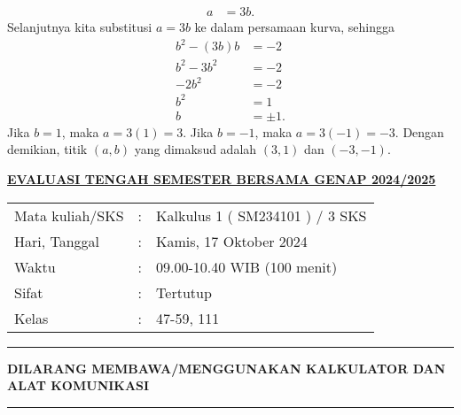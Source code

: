\documentclass[11pt,openany,a4paper]{article}
\renewcommand{\headrulewidth}{0pt}
\renewcommand{\footrulewidth}{0pt}
\begin{document}
\begin{enumerate}
\begin{align*}
              a                                    & = 3b.
          \end{align*}
          Selanjutnya kita substitusi $a=3b$ ke dalam persamaan kurva, sehingga
          \begin{align*}
              b^2 - (3b)b & = -2     \\
              b^2 - 3b^2  & = -2     \\
              -2b^2       & = -2     \\
              b^2         & = 1      \\
              b           & = \pm 1.
          \end{align*}
          Jika $b=1$, maka $a=3(1)=3$. Jika $b=-1$, maka $a=3(-1)=-3$. Dengan demikian, titik $(a,b)$ yang dimaksud adalah $(3,1)$ dan $(-3,-1)$.
\end{enumerate}

\newpage
\renewcommand{\arraystretch}{1}
\fancyhead{}
\fancyfoot{}
\fancyhead[r]{}
\renewcommand{\headrulewidth}{0pt}
\renewcommand{\footrulewidth}{0pt}
\begin{center}
    {\underline{\textbf{\MakeUppercase{Evaluasi Tengah Semester Bersama Genap 2024/2025}}}}
\end{center}

\begin{center}
    \begin{tabular}{lcl}
        Mata kuliah/SKS & : & Kalkulus 1 ( SM234101 ) / 3 SKS \\
        Hari, Tanggal   & : & Kamis, 17 Oktober 2024          \\
        Waktu           & : & 09.00-10.40 WIB (100 menit)     \\
        Sifat           & : & Tertutup                        \\
        Kelas           & : & 47-59, 111
    \end{tabular}
\end{center}

\noindent\rule{\textwidth}{2.pt}

\setlength{\parindent}{5pt}
\setlength{\parindent}{5pt}
\setlength{\parindent}{5pt}
\par \textbf{\small\MakeUppercase{dilarang membawa/menggunakan kalkulator dan alat komunikasi}}
\par {}
\noindent\rule{\textwidth}{2.pt}
\end{document}
